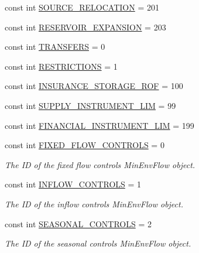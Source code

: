 \begin{DoxyCompactItemize}
\item 
const int \mbox{\hyperlink{classConstants_ab321801ef588e5083ec368d310871523}{S\+O\+U\+R\+C\+E\+\_\+\+R\+E\+L\+O\+C\+A\+T\+I\+ON}} = 201
\item 
const int \mbox{\hyperlink{classConstants_a27567a2a62ed837986156cb424fdc83f}{R\+E\+S\+E\+R\+V\+O\+I\+R\+\_\+\+E\+X\+P\+A\+N\+S\+I\+ON}} = 203
\item 
const int \mbox{\hyperlink{classConstants_a02748ff742cda86e055625ce8ca43133}{T\+R\+A\+N\+S\+F\+E\+RS}} = 0
\item 
const int \mbox{\hyperlink{classConstants_a15c13d76b55f85fae5635ec62063c0d9}{R\+E\+S\+T\+R\+I\+C\+T\+I\+O\+NS}} = 1
\item 
const int \mbox{\hyperlink{classConstants_a459317d221226a86ebf5b00a4f87eaa7}{I\+N\+S\+U\+R\+A\+N\+C\+E\+\_\+\+S\+T\+O\+R\+A\+G\+E\+\_\+\+R\+OF}} = 100
\item 
const int \mbox{\hyperlink{classConstants_a0dbf27e9d760dfcdbde4c841e74bbf78}{S\+U\+P\+P\+L\+Y\+\_\+\+I\+N\+S\+T\+R\+U\+M\+E\+N\+T\+\_\+\+L\+IM}} = 99
\item 
const int \mbox{\hyperlink{classConstants_a4f863f4b075dd82d9c79710fa7437734}{F\+I\+N\+A\+N\+C\+I\+A\+L\+\_\+\+I\+N\+S\+T\+R\+U\+M\+E\+N\+T\+\_\+\+L\+IM}} = 199
\item 
const int \mbox{\hyperlink{classConstants_ad8ac2a802acc9bbd547c676255692ff3}{F\+I\+X\+E\+D\+\_\+\+F\+L\+O\+W\+\_\+\+C\+O\+N\+T\+R\+O\+LS}} = 0
\begin{DoxyCompactList}\small\item\em The ID of the fixed flow controls {\ttfamily Min\+Env\+Flow} object. \end{DoxyCompactList}\item 
const int \mbox{\hyperlink{classConstants_af73061aaa392892f65f5070d7a979895}{I\+N\+F\+L\+O\+W\+\_\+\+C\+O\+N\+T\+R\+O\+LS}} = 1
\begin{DoxyCompactList}\small\item\em The ID of the inflow controls {\ttfamily Min\+Env\+Flow} object. \end{DoxyCompactList}\item 
const int \mbox{\hyperlink{classConstants_a8e78b56c12f7896c4b1f225503172634}{S\+E\+A\+S\+O\+N\+A\+L\+\_\+\+C\+O\+N\+T\+R\+O\+LS}} = 2
\begin{DoxyCompactList}\small\item\em The ID of the seasonal controls {\ttfamily Min\+Env\+Flow} object. \end{DoxyCompactList}\item 

\end{DoxyCompactItemize}
